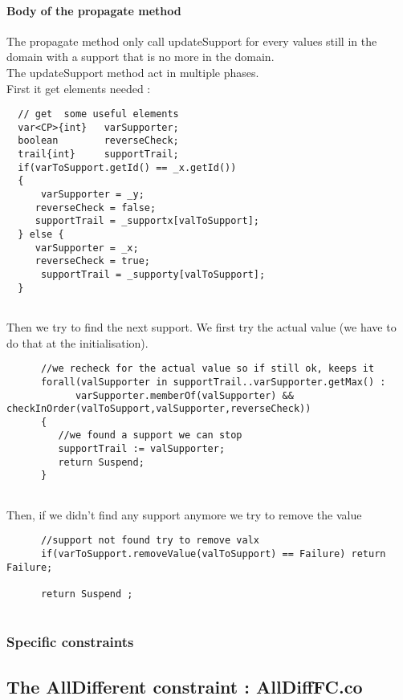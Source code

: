 \documentclass{eplDoc}
\begin{document}
\paragraph{Body of the propagate method}
The propagate method only call updateSupport for every values still in the domain with a support that is no more in the domain.\\
The updateSupport method act in multiple phases.\\ 
First it get elements needed : 
\begin{lstlisting}
  // get  some useful elements
  var<CP>{int}   varSupporter;
  boolean        reverseCheck;
  trail{int}     supportTrail;
  if(varToSupport.getId() == _x.getId())
  { 
      varSupporter = _y;
     reverseCheck = false;
     supportTrail = _supportx[valToSupport];
  } else { 
     varSupporter = _x;
     reverseCheck = true;
      supportTrail = _supporty[valToSupport];
  }
    
\end{lstlisting}

Then we try to find the next support.  We first try the actual value (we have to do that at the initialisation).
\begin{lstlisting}
      //we recheck for the actual value so if still ok, keeps it
      forall(valSupporter in supportTrail..varSupporter.getMax() : 
            varSupporter.memberOf(valSupporter) && checkInOrder(valToSupport,valSupporter,reverseCheck))
      {
         //we found a support we can stop
         supportTrail := valSupporter;
         return Suspend;
      }  
    
\end{lstlisting}
Then, if we didn't find any support anymore we try to remove the value 
\begin{lstlisting}
      //support not found try to remove valx
      if(varToSupport.removeValue(valToSupport) == Failure) return Failure;
      
      return Suspend ;
    
\end{lstlisting}
\subsubsection{Specific constraints}

\subsection{The AllDifferent constraint : AllDiffFC.co} %
\end{document}
